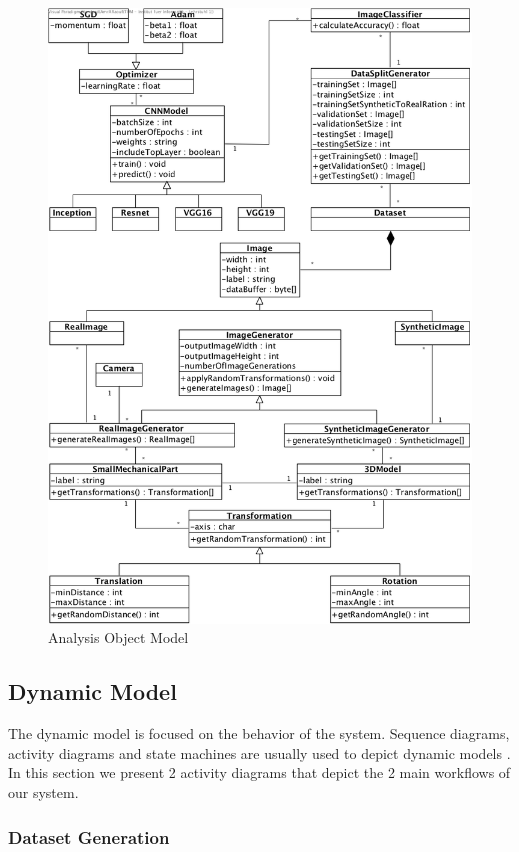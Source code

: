 \documentclass[a4paper,12pt,twoside]{report}
\begin{document}
\begin{figure}[H]
\centering
  \includegraphics[width=\textwidth]{AOM}
\caption{Analysis Object Model}
\label{fig:AOM}
\end{figure}

\subsection{Dynamic Model}

The dynamic model is focused on the behavior of the system. Sequence diagrams, activity diagrams and state machines are usually used to depict dynamic models \cite{bruegge2004object}. In this section we present 2 activity diagrams that depict the 2 main workflows of our system.

\subsubsection{Dataset Generation}
\end{document}
